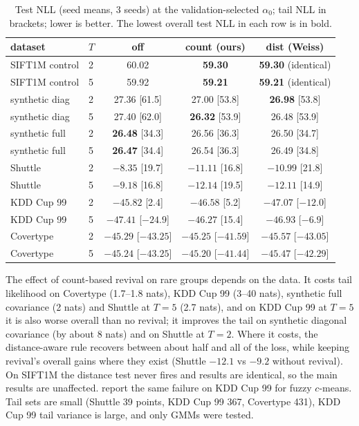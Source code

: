 \documentclass[10pt]{article}
\newcommand{\best}[1]{\textbf{#1}}
\begin{document}
\begin{table}[h]
\centering\small
\caption{Test NLL (seed means, 3 seeds) at the validation-selected $\alpha_0$; tail NLL in brackets; lower is
better. The lowest overall test NLL in each row is in bold.}\label{tab:rare}
\begin{tabular}{llccc}
\toprule
dataset & $T$ & off & count (ours) & dist (Weiss) \\
\midrule
SIFT1M control & 2 & 60.02 & \best{59.30} & \best{59.30} (identical) \\
SIFT1M control & 5 & 59.92 & \best{59.21} & \best{59.21} (identical) \\
synthetic diag & 2 & 27.36 [61.5] & 27.00 [53.8] & \best{26.98} [53.8] \\
synthetic diag & 5 & 27.40 [62.0] & \best{26.32} [53.9] & 26.48 [53.9] \\
synthetic full & 2 & \best{26.48} [34.3] & 26.56 [36.3] & 26.50 [34.7] \\
synthetic full & 5 & \best{26.47} [34.4] & 26.54 [36.3] & 26.49 [34.8] \\
Shuttle & 2 & $-8.35$ [19.7] & \best{$-11.11$} [16.8] & $-10.99$ [21.8] \\
Shuttle & 5 & $-9.18$ [16.8] & \best{$-12.14$} [19.5] & $-12.11$ [14.9] \\
KDD Cup 99 & 2 & $-45.82$ [2.4] & $-46.58$ [5.2] & \best{$-47.07$} [$-12.0$] \\
KDD Cup 99 & 5 & \best{$-47.41$} [$-24.9$] & $-46.27$ [15.4] & $-46.93$ [$-6.9$] \\
Covertype & 2 & $-45.29$ [$-43.25$] & $-45.25$ [$-41.59$] & \best{$-45.57$} [$-43.05$] \\
Covertype & 5 & $-45.24$ [$-43.25$] & $-45.20$ [$-41.44$] & \best{$-45.47$} [$-42.29$] \\
\bottomrule
\end{tabular}
\end{table}

The effect of count-based revival on rare groups depends on the data. It costs tail likelihood on Covertype
(1.7--1.8 nats), KDD Cup 99 (3--40 nats), synthetic full covariance (2 nats) and Shuttle at $T = 5$ (2.7 nats), and
on KDD Cup 99 at $T = 5$ it is also worse overall than no revival; it improves the tail on synthetic diagonal
covariance (by about 8 nats) and on Shuttle at $T = 2$. Where it costs, the distance-aware rule recovers between
about half and all of the loss, while keeping revival's overall gains where they exist (Shuttle $-12.1$ vs $-9.2$
without revival). On SIFT1M the distance test never fires and results are identical,
so the main results are unaffected. \citet{tiwari2026fuzzy} report the same failure on KDD Cup 99 for fuzzy
$c$-means. Tail sets are small (Shuttle 39 points, KDD Cup 99 367, Covertype 431), KDD Cup
99 tail variance is large, and only GMMs were tested.
\end{document}
